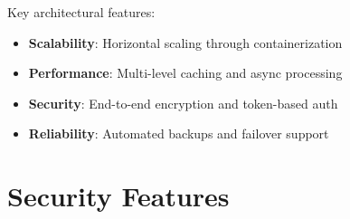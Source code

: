 \begin{tcolorbox}
    Key architectural features:
    \begin{itemize}
        \item \textbf{Scalability}: Horizontal scaling through containerization
        \item \textbf{Performance}: Multi-level caching and async processing
        \item \textbf{Security}: End-to-end encryption and token-based auth
        \item \textbf{Reliability}: Automated backups and failover support
    \end{itemize}
\end{tcolorbox}

\section{Security Features}

